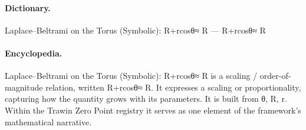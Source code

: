 \paragraph{Dictionary.}
Laplace–Beltrami on the Torus (Symbolic): R+rcosθ≈ R — R+rcosθ≈ R

\paragraph{Encyclopedia.}
Laplace–Beltrami on the Torus (Symbolic): R+rcosθ≈ R is a scaling / order-of-magnitude relation, written R+rcosθ≈ R. It expresses a scaling or proportionality, capturing how the quantity grows with its parameters. It is built from θ, R, r. Within the Trawin Zero Point registry it serves as one element of the framework's mathematical narrative.
